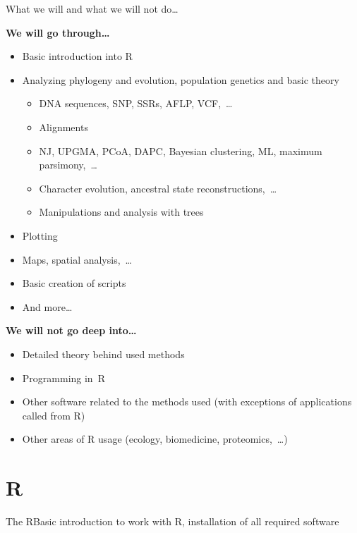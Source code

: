 \documentclass[compress, ucs, xelatex, 11pt, xcolor=svgnames, aspectratio=169,
	hyperref={
		bookmarks=true,
		unicode=true,
		colorlinks=true,
		pdftitle={Molecular data in R},
		plainpages=false,
		pdfauthor={Vojtech Zeisek},
		pdfsubject={Course about phylogeny and evolution in R},
		pdfcreator={XeLaTeX},
		pdfkeywords={R, evolution, phylogeny, molecular data},
		linkcolor=Crimson, %
		anchorcolor=Magenta, %
		citecolor=Magenta, %
		filecolor=Magenta, %
		menucolor=Magenta, %
		urlcolor=DodgerBlue, %
		pdftex},
	url={hyphens, lowtilde} %
	]{beamer}
\begin{document}
\begin{frame}{What we will and what we will not do\ldots}
	\begin{multicols}{2}
		\textbf{We will go through\ldots}
		\begin{itemize}
			\item Basic introduction into R
			\item Analyzing phylogeny and evolution, population genetics and basic theory
			\begin{itemize}
				\item DNA sequences, SNP, SSRs, AFLP, VCF,~\ldots
				\item Alignments
				\item NJ, UPGMA, PCoA, DAPC, Bayesian clustering, ML, maximum parsimony,~\ldots
				\item Character evolution, ancestral state reconstructions,~\ldots
				\item Manipulations and analysis with trees
			\end{itemize}
			\item Plotting
		\columnbreak
			\item Maps, spatial analysis,~\ldots
			\item Basic creation of scripts
			\item And more\ldots
		\end{itemize}
		\textbf{We will not go deep into\ldots}
		\begin{itemize}
			\item Detailed theory behind used methods
			\item Programming in~R
			\item Other software related to the methods used (with exceptions of applications called from R)
			\item Other areas of R usage (ecology, biomedicine, proteomics,~\ldots)
		\end{itemize}
	\end{multicols}
\end{frame}

\section{R}

\begin{frame}{The R}{Basic introduction to work with R, installation of all required software}
	\tableofcontents[currentsection, sectionstyle=show/hide, hideothersubsections]
\end{frame}
\end{document}
